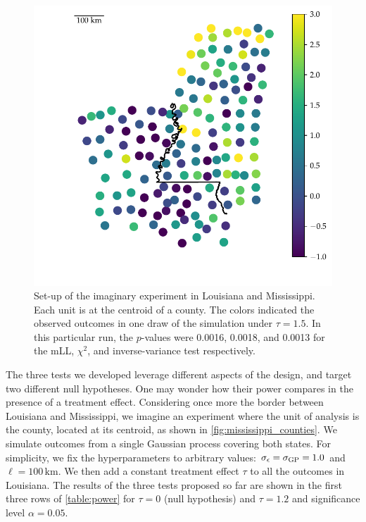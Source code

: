 \begin{figure}[tb]
    \centering
    \includegraphics[height=0.4\textheight]{figures/mississippi_sim.pdf}
    \caption{
		\label{fig:mississippi_counties}
		Set-up of the imaginary experiment in Louisiana and Mississippi. Each unit is at the centroid of a county. The colors indicated the observed outcomes in one draw of the simulation under \(\tau=1.5\). In this particular run, the \(p\)-values were 0.0016, 0.0018, and 0.0013 for the mLL, \(\chi^2\), and inverse-variance test respectively.}
\end{figure}

	The three tests we developed leverage different aspects of the design, and target two different null hypotheses. One may wonder how their power compares in the presence of a treatment effect. Considering once more the border between Louisiana and Mississippi, we imagine an experiment where the unit of analysis is the county, located at its centroid, as shown in \autoref{fig:mississippi_counties}.
We simulate outcomes from a single Gaussian process covering both states. For simplicity, we fix the hyperparameters to arbitrary values: \(\sigma_{\epsilon}=\sigma_{\mathrm{GP}}=1.0\) and \(\ell=100\,\mathrm{km}\).
We then add a constant treatment effect \(\tau\) to all the outcomes in Louisiana.
The results of the three tests proposed so far are shown in the first three rows of \autoref{table:power} for \(\tau=0\) (null hypothesis) and \(\tau=1.2\) and significance level \(\alpha=0.05\).

